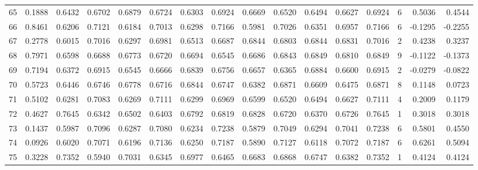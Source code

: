 \begin{tabular}{lrrrrrrrrrrrrrrr}
65  &      0.1888 &  0.6432 &  0.6702 &  0.6879 &  0.6724 &  0.6303 &  0.6924 &  0.6669 &  0.6520 &  0.6494 &   0.6627 &     0.6924 &      6 &                    0.5036 &                     0.4544 \\
66  &      0.8461 &  0.6206 &  0.7121 &  0.6184 &  0.7013 &  0.6298 &  0.7166 &  0.5981 &  0.7026 &  0.6351 &   0.6957 &     0.7166 &      6 &                   -0.1295 &                    -0.2255 \\
67  &      0.2778 &  0.6015 &  0.7016 &  0.6297 &  0.6981 &  0.6513 &  0.6687 &  0.6844 &  0.6803 &  0.6844 &   0.6831 &     0.7016 &      2 &                    0.4238 &                     0.3237 \\
68  &      0.7971 &  0.6598 &  0.6688 &  0.6773 &  0.6720 &  0.6694 &  0.6545 &  0.6686 &  0.6843 &  0.6849 &   0.6810 &     0.6849 &      9 &                   -0.1122 &                    -0.1373 \\
69  &      0.7194 &  0.6372 &  0.6915 &  0.6545 &  0.6666 &  0.6839 &  0.6756 &  0.6657 &  0.6365 &  0.6884 &   0.6600 &     0.6915 &      2 &                   -0.0279 &                    -0.0822 \\
70  &      0.5723 &  0.6446 &  0.6746 &  0.6778 &  0.6716 &  0.6844 &  0.6747 &  0.6382 &  0.6871 &  0.6609 &   0.6475 &     0.6871 &      8 &                    0.1148 &                     0.0723 \\
71  &      0.5102 &  0.6281 &  0.7083 &  0.6269 &  0.7111 &  0.6299 &  0.6969 &  0.6599 &  0.6520 &  0.6494 &   0.6627 &     0.7111 &      4 &                    0.2009 &                     0.1179 \\
72  &      0.4627 &  0.7645 &  0.6342 &  0.6502 &  0.6403 &  0.6792 &  0.6819 &  0.6828 &  0.6720 &  0.6370 &   0.6726 &     0.7645 &      1 &                    0.3018 &                     0.3018 \\
73  &      0.1437 &  0.5987 &  0.7096 &  0.6287 &  0.7080 &  0.6234 &  0.7238 &  0.5879 &  0.7049 &  0.6294 &   0.7041 &     0.7238 &      6 &                    0.5801 &                     0.4550 \\
74  &      0.0926 &  0.6020 &  0.7071 &  0.6196 &  0.7136 &  0.6250 &  0.7187 &  0.5890 &  0.7127 &  0.6118 &   0.7072 &     0.7187 &      6 &                    0.6261 &                     0.5094 \\
75  &      0.3228 &  0.7352 &  0.5940 &  0.7031 &  0.6345 &  0.6977 &  0.6465 &  0.6683 &  0.6868 &  0.6747 &   0.6382 &     0.7352 &      1 &                    0.4124 &                     0.4124 \\

\end{tabular}
